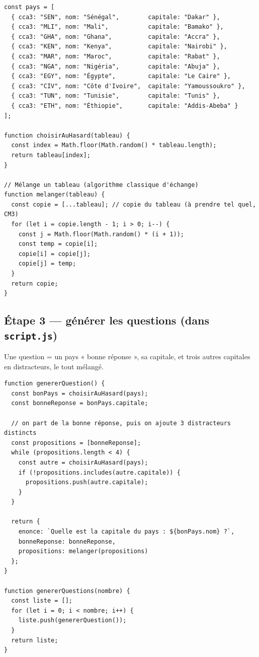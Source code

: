 \documentclass[11pt,a4paper]{article}
\begin{document}
\begin{lstlisting}[style=js]
const pays = [
  { cca3: "SEN", nom: "Sénégal",        capitale: "Dakar" },
  { cca3: "MLI", nom: "Mali",           capitale: "Bamako" },
  { cca3: "GHA", nom: "Ghana",          capitale: "Accra" },
  { cca3: "KEN", nom: "Kenya",          capitale: "Nairobi" },
  { cca3: "MAR", nom: "Maroc",          capitale: "Rabat" },
  { cca3: "NGA", nom: "Nigéria",        capitale: "Abuja" },
  { cca3: "EGY", nom: "Égypte",         capitale: "Le Caire" },
  { cca3: "CIV", nom: "Côte d'Ivoire",  capitale: "Yamoussoukro" },
  { cca3: "TUN", nom: "Tunisie",        capitale: "Tunis" },
  { cca3: "ETH", nom: "Éthiopie",       capitale: "Addis-Abeba" }
];

function choisirAuHasard(tableau) {
  const index = Math.floor(Math.random() * tableau.length);
  return tableau[index];
}

// Mélange un tableau (algorithme classique d'échange)
function melanger(tableau) {
  const copie = [...tableau]; // copie du tableau (à prendre tel quel, CM3)
  for (let i = copie.length - 1; i > 0; i--) {
    const j = Math.floor(Math.random() * (i + 1));
    const temp = copie[i];
    copie[i] = copie[j];
    copie[j] = temp;
  }
  return copie;
}
\end{lstlisting}

\subsection{Étape 3 --- générer les questions (dans \texttt{script.js})}

Une question = un pays « bonne réponse », sa capitale, et trois autres capitales en distracteurs, le tout mélangé.

\begin{lstlisting}[style=js]
function genererQuestion() {
  const bonPays = choisirAuHasard(pays);
  const bonneReponse = bonPays.capitale;

  // on part de la bonne réponse, puis on ajoute 3 distracteurs distincts
  const propositions = [bonneReponse];
  while (propositions.length < 4) {
    const autre = choisirAuHasard(pays);
    if (!propositions.includes(autre.capitale)) {
      propositions.push(autre.capitale);
    }
  }

  return {
    enonce: `Quelle est la capitale du pays : ${bonPays.nom} ?`,
    bonneReponse: bonneReponse,
    propositions: melanger(propositions)
  };
}

function genererQuestions(nombre) {
  const liste = [];
  for (let i = 0; i < nombre; i++) {
    liste.push(genererQuestion());
  }
  return liste;
}
\end{lstlisting}
\end{document}

